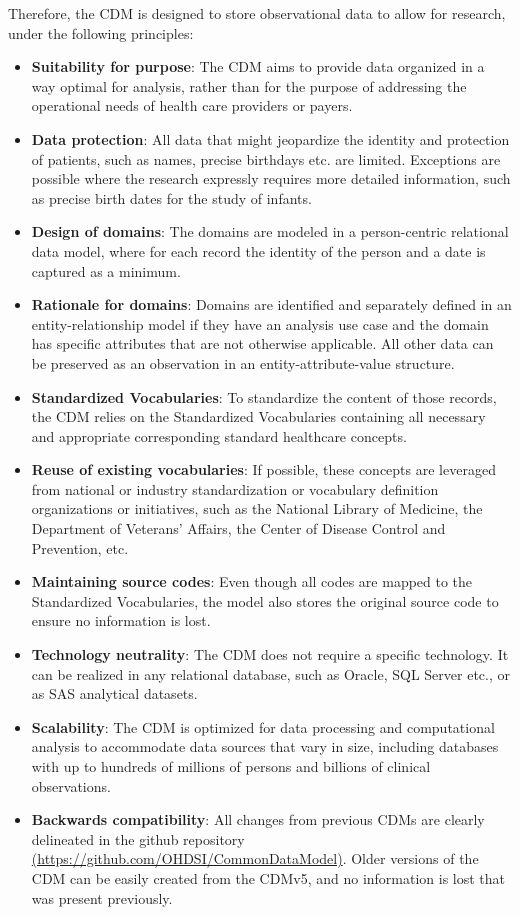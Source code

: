 \documentclass[]{book}
\providecommand{\tightlist}{%
  \setlength{\itemsep}{0pt}\setlength{\parskip}{0pt}}
\begin{document}
Therefore, the CDM is designed to store observational data to allow for
research, under the following principles:

\begin{itemize}
\tightlist
\item
  \textbf{Suitability for purpose}: The CDM aims to provide data
  organized in a way optimal for analysis, rather than for the purpose
  of addressing the operational needs of health care providers or
  payers.
\item
  \textbf{Data protection}: All data that might jeopardize the identity
  and protection of patients, such as names, precise birthdays etc. are
  limited. Exceptions are possible where the research expressly requires
  more detailed information, such as precise birth dates for the study
  of infants.
\item
  \textbf{Design of domains}: The domains are modeled in a
  person-centric relational data model, where for each record the
  identity of the person and a date is captured as a minimum.
\item
  \textbf{Rationale for domains}: Domains are identified and separately
  defined in an entity-relationship model if they have an analysis use
  case and the domain has specific attributes that are not otherwise
  applicable. All other data can be preserved as an observation in an
  entity-attribute-value structure.
\item
  \textbf{Standardized Vocabularies}: To standardize the content of
  those records, the CDM relies on the Standardized Vocabularies
  containing all necessary and appropriate corresponding standard
  healthcare concepts.
\item
  \textbf{Reuse of existing vocabularies}: If possible, these concepts
  are leveraged from national or industry standardization or vocabulary
  definition organizations or initiatives, such as the National Library
  of Medicine, the Department of Veterans' Affairs, the Center of
  Disease Control and Prevention, etc.
\item
  \textbf{Maintaining source codes}: Even though all codes are mapped to
  the Standardized Vocabularies, the model also stores the original
  source code to ensure no information is lost.
\item
  \textbf{Technology neutrality}: The CDM does not require a specific
  technology. It can be realized in any relational database, such as
  Oracle, SQL Server etc., or as SAS analytical datasets.
\item
  \textbf{Scalability}: The CDM is optimized for data processing and
  computational analysis to accommodate data sources that vary in size,
  including databases with up to hundreds of millions of persons and
  billions of clinical observations.
\item
  \textbf{Backwards compatibility}: All changes from previous CDMs are
  clearly delineated in the github repository
  \href{https://github.com/OHDSI/CommonDataModel}{(https://github.com/OHDSI/CommonDataModel)}.
  Older versions of the CDM can be easily created from the CDMv5, and no
  information is lost that was present previously.
\end{itemize}
\end{document}
